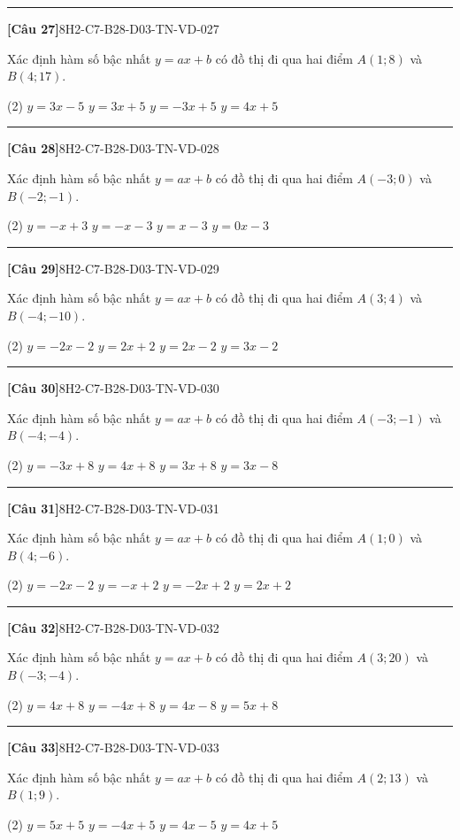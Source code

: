\documentclass[12pt,a4paper]{article}
\newif\ifloigiai
\newenvironment{cauhoi}[2]{%
  \par\medskip\noindent\rule{\textwidth}{0.4pt}\par\nopagebreak
  \noindent\textbf{[#1]}\hfill{\scriptsize\ttfamily #2}\par\nopagebreak\smallskip}{\par}
\newcommand{\dapan}[1]{\ifloigiai\par\smallskip\noindent\textit{Đáp án:} \textbf{#1}\par\fi}
\begin{document}
\begin{cauhoi}{Câu 27}{8H2-C7-B28-D03-TN-VD-027}
Xác định hàm số bậc nhất $y=ax+b$ có đồ thị đi qua hai điểm $A(1;8)$ và $B(4;17)$.
\begin{tasks}(2)
\task $y=3x-5$
\task $y=3x+5$
\task $y=-3x+5$
\task $y=4x+5$
\end{tasks}
\dapan{B}
\end{cauhoi}
\begin{cauhoi}{Câu 28}{8H2-C7-B28-D03-TN-VD-028}
Xác định hàm số bậc nhất $y=ax+b$ có đồ thị đi qua hai điểm $A(-3;0)$ và $B(-2;-1)$.
\begin{tasks}(2)
\task $y=-x+3$
\task $y=-x-3$
\task $y=x-3$
\task $y=0x-3$
\end{tasks}
\dapan{B}
\end{cauhoi}
\begin{cauhoi}{Câu 29}{8H2-C7-B28-D03-TN-VD-029}
Xác định hàm số bậc nhất $y=ax+b$ có đồ thị đi qua hai điểm $A(3;4)$ và $B(-4;-10)$.
\begin{tasks}(2)
\task $y=-2x-2$
\task $y=2x+2$
\task $y=2x-2$
\task $y=3x-2$
\end{tasks}
\dapan{C}
\end{cauhoi}
\begin{cauhoi}{Câu 30}{8H2-C7-B28-D03-TN-VD-030}
Xác định hàm số bậc nhất $y=ax+b$ có đồ thị đi qua hai điểm $A(-3;-1)$ và $B(-4;-4)$.
\begin{tasks}(2)
\task $y=-3x+8$
\task $y=4x+8$
\task $y=3x+8$
\task $y=3x-8$
\end{tasks}
\dapan{C}
\end{cauhoi}
\begin{cauhoi}{Câu 31}{8H2-C7-B28-D03-TN-VD-031}
Xác định hàm số bậc nhất $y=ax+b$ có đồ thị đi qua hai điểm $A(1;0)$ và $B(4;-6)$.
\begin{tasks}(2)
\task $y=-2x-2$
\task $y=-x+2$
\task $y=-2x+2$
\task $y=2x+2$
\end{tasks}
\dapan{C}
\end{cauhoi}
\begin{cauhoi}{Câu 32}{8H2-C7-B28-D03-TN-VD-032}
Xác định hàm số bậc nhất $y=ax+b$ có đồ thị đi qua hai điểm $A(3;20)$ và $B(-3;-4)$.
\begin{tasks}(2)
\task $y=4x+8$
\task $y=-4x+8$
\task $y=4x-8$
\task $y=5x+8$
\end{tasks}
\dapan{A}
\end{cauhoi}
\begin{cauhoi}{Câu 33}{8H2-C7-B28-D03-TN-VD-033}
Xác định hàm số bậc nhất $y=ax+b$ có đồ thị đi qua hai điểm $A(2;13)$ và $B(1;9)$.
\begin{tasks}(2)
\task $y=5x+5$
\task $y=-4x+5$
\task $y=4x-5$
\task $y=4x+5$
\end{tasks}
\dapan{D}
\end{cauhoi}
\end{document}
